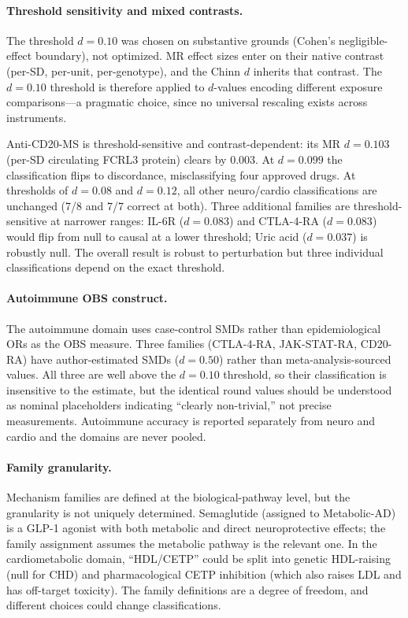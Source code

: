 \documentclass[11pt]{article}
\begin{document}
\paragraph{Threshold sensitivity and mixed contrasts.} The threshold $d = 0.10$ was chosen on substantive grounds (Cohen's negligible-effect boundary), not optimized. MR effect sizes enter on their native contrast (per-SD, per-unit, per-genotype), and the Chinn $d$ inherits that contrast. The $d = 0.10$ threshold is therefore applied to $d$-values encoding different exposure comparisons---a pragmatic choice, since no universal rescaling exists across instruments.

Anti-CD20-MS is threshold-sensitive and contrast-dependent: its MR $d = 0.103$ (per-SD circulating FCRL3 protein) clears by 0.003. At $d = 0.099$ the classification flips to discordance, misclassifying four approved drugs. At thresholds of $d = 0.08$ and $d = 0.12$, all other neuro/cardio classifications are unchanged (7/8 and 7/7 correct at both). Three additional families are threshold-sensitive at narrower ranges: IL-6R ($d = 0.083$) and CTLA-4-RA ($d = 0.083$) would flip from null to causal at a lower threshold; Uric acid ($d = 0.037$) is robustly null. The overall result is robust to perturbation but three individual classifications depend on the exact threshold.

\paragraph{Autoimmune OBS construct.} The autoimmune domain uses case-control SMDs rather than epidemiological ORs as the OBS measure. Three families (CTLA-4-RA, JAK-STAT-RA, CD20-RA) have author-estimated SMDs ($d = 0.50$) rather than meta-analysis-sourced values. All three are well above the $d = 0.10$ threshold, so their classification is insensitive to the estimate, but the identical round values should be understood as nominal placeholders indicating ``clearly non-trivial,'' not precise measurements. Autoimmune accuracy is reported separately from neuro and cardio and the domains are never pooled.

\paragraph{Family granularity.} Mechanism families are defined at the biological-pathway level, but the granularity is not uniquely determined. Semaglutide (assigned to Metabolic-AD) is a GLP-1 agonist with both metabolic and direct neuroprotective effects; the family assignment assumes the metabolic pathway is the relevant one. In the cardiometabolic domain, ``HDL/CETP'' could be split into genetic HDL-raising (null for CHD) and pharmacological CETP inhibition (which also raises LDL and has off-target toxicity). The family definitions are a degree of freedom, and different choices could change classifications.
\end{document}
